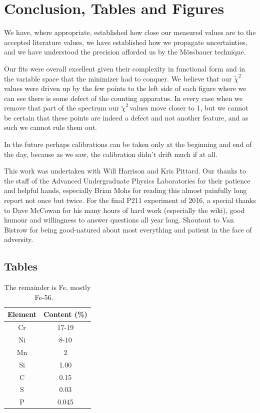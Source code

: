 \documentclass[reprint, nobibnotes, amssymb, amsmath, amsfonts, mathtools, mathrsfs, floatfix]{revtex4-1}
\newcommand{\redchi}{$\tilde{\chi}^2\,$}
\newcommand{\moss}{M\"{o}ssbauer }
\begin{document}
  \section{Conclusion, Tables and Figures}
    We have, where appropriate, established how close our measured values are to the accepted literature values, we have established how we propagate uncertainties, and we have understood the precision afforded us by the \moss technique.

    Our fits were overall excellent given their complexity in functional form and in the variable space that the minimizer had to conquer.  We believe that our \redchi values were driven up by the few points to the left side of each figure where we can see there is some defect of the counting apparatus.  In every case when we remove that part of the spectrum our \redchi values move closer to 1, but we cannot be certain that these points are indeed a defect and not another feature, and as such we cannot rule them out.

    In the future perhaps calibrations can be taken only at the beginning and end of the day, because as we saw, the calibration didn't drift much if at all.

    This work was undertaken with Will Harrison and Kris Pittard.  Our thanks to the staff of the Advanced Undergraduate Physics Laboratories for their patience and helpful hands, especially Brian Mohs for reading this almost painfully long report not once but twice.  For the final P211 experiment of 2016, a special thanks to Dave McCowan for his many hours of hard work (especially the wiki), good humour and willingness to answer questions all year long.  Shoutout to Van Bistrow for being good-natured about most everything and patient in the face of adversity.

    \subsection{Tables}
      \FloatBarrier
      \begin{table}[h]
        \centering
        \begin{tabular}{|c|c|}
          \hline
          Element & Content (\%) \\ \hline
          Cr & 17-19 \\ \hline
          Ni & 8-10 \\ \hline
          Mn & 2 \\ \hline
          Si & 1.00 \\ \hline
          C & 0.15 \\ \hline
          S & 0.03 \\ \hline
          P & 0.045 \\ \hline
        \end{tabular}
        \caption{The remainder is Fe, mostly Fe-56.~\cite{stainless_chemical_makeup}~\label{tab:SS_chemical_makeup}}
      \end{table}
\end{document}

